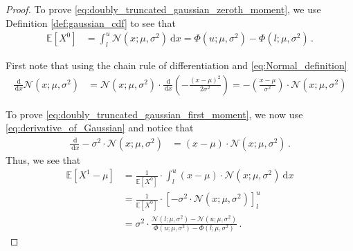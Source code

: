 \documentclass[a4paper]{article}
\newcommand{\Normal}[3]{{\mathcal N} \left({#1};{#2},{#3}\right)}
\newcommand{\NormalCDF}[3]{\Phi \left({#1};{#2},{#3}\right)}
\newcommand{\expect}[1]{{\mathbb E \left[ {#1} \right]}}
\newcommand{\intd}[1]{\ \mathrm{d}{#1}}
\theoremstyle{definition}
\begin{document}
\begin{proof}
    To prove \eqref{eq:doubly_truncated_gaussian_zeroth_moment}, we use Definition \ref{def:gaussian_cdf} to see that 
    \begin{align*}
        \expect{X^0} & = \int_l^u \Normal{x}{\mu}{\sigma^2} \intd{x} = \NormalCDF{u}{\mu}{\sigma^2} - \NormalCDF{l}{\mu}{\sigma^2} \,.
    \end{align*}
    
    First note that using the chain rule of differentiation and \eqref{eq:Normal_definition}
    \begin{align}
        \frac{\intd{}}{\intd{x}} \Normal{x}{\mu}{\sigma^2} & = \Normal{x}{\mu}{\sigma^2} \cdot \frac{\intd{}}{\intd{x}} \left( -\frac{(x-\mu)^2}{2\sigma^2} \right)
        = -\left( \frac{x-\mu}{\sigma^2} \right) \cdot \Normal{x}{\mu}{\sigma^2} \label{eq:derivative_of_Gaussian}
    \end{align}

    To prove \eqref{eq:doubly_truncated_gaussian_first_moment}, we now use \eqref{eq:derivative_of_Gaussian} and notice that 
    \begin{align*}
        \frac{\intd{}}{\intd{x}} -\sigma^2 \cdot \Normal{x}{\mu}{\sigma^2}
        & = \left( x - \mu \right) \cdot \Normal{x}{\mu}{\sigma^2} \,.
    \end{align*}
    Thus, we see that 
    \begin{align*}
        \expect{X^1 - \mu} 
        & = \frac{1}{\expect{X^0}} \cdot \int_l^u \left( x - \mu \right) \cdot \Normal{x}{\mu}{\sigma^2} \intd{x} \\
        & = \frac{1}{\expect{X^0}} \cdot \left[ -\sigma^2 \cdot \Normal{x}{\mu}{\sigma^2} \right]_l^u \\
        & = \sigma^2 \cdot \frac{\Normal{l}{\mu}{\sigma^2} - \Normal{u}{\mu}{\sigma^2}}{\NormalCDF{u}{\mu}{\sigma^2} - \NormalCDF{l}{\mu}{\sigma^2}} \,.
    \end{align*}
    

\end{proof}
\end{document}
